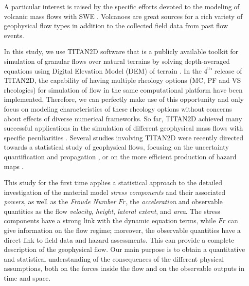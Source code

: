 \documentclass{article}
\begin{document}
A particular interest is raised by the specific efforts devoted to the modeling of volcanic mass flows with SWE \citep{FreundtBursik1998,Bursik2005,Saucedo2005, Kelfoun2005,Charbonnier2009,Kelfoun2009,Procter2010,Sulpizio2010,Kelfoun2011,Charbonnier2013}. Volcanoes are great sources for a rich variety of geophysical flow types in addition to the collected field data from past flow events.

In this study, we use TITAN2D software that is a publicly available toolkit for simulation of granular flows over natural terrains by solving depth-averaged equations using Digital Elevation Model (DEM) of terrain \citep{Pitman2003a, Patra2005, Patra2006, Yu2009, Aghakhani2016}. In the $\mathrm{4^{\mathrm{th}}}$ release of TITAN2D, the capability of having multiple rheology options (MC, PF and VS rheologies) for simulation of flow in the same computational platform have been implemented. Therefore, we can perfectly make use of this opportunity and only focus on modeling characteristics of these rheology options without concerns about effects of diverse numerical frameworks. So far, TITAN2D achieved many successful applications in the simulation of different geophysical mass flows with specific peculiarities \citep{Sheridan2005, Rupp2006, Norini2008, Charbonnier2009, Procter2010, Sheridan2010, Sulpizio2010, Capra2011}. Several studies involving TITAN2D were recently directed towards a statistical study of geophysical flows, focusing on the uncertainty quantification and propagation \citep{Dalbey2008, Dalbey2009, Stefanescu2012b, Stefanescu2012a}, or on the more efficient production of hazard maps \citep{Bayarri2009, Spiller2014,Bayarri2015, Ogburn2016}.

This study for the first time applies a statistical approach to the detailed investigation of the material model \emph{stress components} and their associated \emph{powers}, as well as the \emph{Froude Number} $Fr$, the \emph{acceleration} and observable quantities as the flow \emph{velocity}, \emph{height}, \emph{lateral extent}, and \emph{area}. The stress components have a strong link with the dynamic equation terms, while $Fr$ can give information on the flow regime; moreover, the observable quantities have a direct link to field data and hazard assessments. This can provide a complete description of the geophysical flow. Our main purpose is to obtain a quantitative and statistical understanding of the consequences of the different physical assumptions, both on the forces inside the flow and on the observable outputs in time and space.
\end{document}

